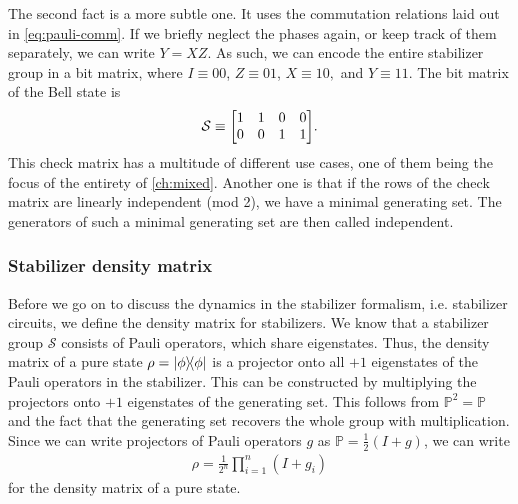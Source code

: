 The second fact is a more subtle one. It uses the commutation relations
laid out in \cref{eq:pauli-comm}. If we briefly neglect the phases again, or keep
track of them separately, we can write $Y=XZ$. As such, we can encode the
entire stabilizer group in a bit matrix, where $I \equiv 00$, $Z \equiv 01$, $X
\equiv 10,$ and $Y \equiv 11$. The bit matrix of the Bell state is
\begin{align}
  \mathcal{S} \equiv \mqty[1 & 1 & 0 & 0 \\ 0 & 0 & 1 & 1]
.\end{align}
This check matrix has a multitude of different use cases, one of them being the
focus of the entirety of \cref{ch:mixed}.
Another one is that if the rows of the
check matrix are linearly independent (mod 2), we have a minimal generating
set. The generators of such a minimal generating set are then called
independent. 

\subsubsection{Stabilizer density matrix}
Before we go on to discuss the dynamics in the stabilizer formalism, i.e.
stabilizer circuits, we define the density matrix for stabilizers. We know that
a stabilizer group $\mathcal{S}$ consists of Pauli operators, which share eigenstates. 
Thus, the density matrix of a pure state $\rho = \dyad{\phi}$ is a
projector onto all $+1$ eigenstates of the Pauli operators in the stabilizer.
This can be constructed by multiplying the projectors onto $+1$ eigenstates of
the generating set. This follows from $\mathbb{P}^2 = \mathbb{P}$ and the fact
that the generating set recovers the whole group with multiplication. Since we
can write projectors of Pauli operators $g$ as $\mathbb{P} = \frac{1}{2}(I+g)$,
we can write
\begin{align}
  \rho = \frac{1}{2^n} \prod_{i=1}^n (I + g_i)
\end{align}
for the density matrix of a pure state.


